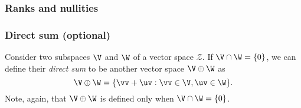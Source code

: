 \begin{frame}
\frametitle{Ranks and nullities}
\end{frame}

\begin{frame}
\frametitle{Direct sum (optional)}

Consider two subspaces $\V$ and $\W$ of a vector space ${\mathcal Z}$.
If $\V\cap\W=\{0\}$, we can define their {\em direct sum} to be
another vector space $\V\oplus\W$ as
\[
\V\oplus\W = \{\vv+\uv : \vv\in\V, \uv\in\W\}.
\]
Note, again, that $\V\oplus\W$ is defined only when $\V\cap\W=\{0\}$.
\end{frame}


